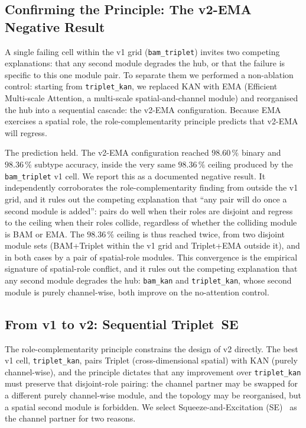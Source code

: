 \subsection{Confirming the Principle: The v2-EMA Negative
Result}\label{subsec:emaneg}

A single failing cell within the v1 grid (\texttt{bam\_triplet}) invites two
competing explanations: that any second module degrades the hub, or that the
failure is specific to this one module pair. To separate them we performed a
non-ablation control: starting from \texttt{triplet\_kan}, we replaced KAN with
EMA (Efficient Multi-scale Attention, a multi-scale spatial-and-channel module)
and reorganised the hub into a sequential cascade: the v2-EMA configuration.
Because EMA exercises a spatial role, the role-complementarity principle
predicts that v2-EMA will regress.

The prediction held. The v2-EMA configuration reached $98.60\,\%$ binary and
$98.36\,\%$ subtype accuracy, inside the very same $98.36\,\%$ ceiling
produced by the \texttt{bam\_triplet} v1 cell. We report this as a documented
negative result. It independently corroborates the role-complementarity finding
from outside the v1 grid, and it rules out the competing explanation that
``any pair will do once a second module is added'': pairs do well when their
roles are disjoint and regress to the ceiling when their roles collide,
regardless of whether the colliding module is BAM or EMA. The $98.36\,\%$
ceiling is thus reached twice, from two disjoint module sets (BAM+Triplet
within the v1 grid and Triplet+EMA outside it), and in both cases by a pair of
spatial-role modules. This convergence is the empirical signature of
spatial-role conflict, and it rules out the competing explanation that any
second module degrades the hub: \texttt{bam\_kan} and \texttt{triplet\_kan},
whose second module is purely channel-wise, both improve on the no-attention
control.

\subsection{From v1 to v2: Sequential Triplet~\arrowto{}SE}\label{subsec:v1tov2}

The role-complementarity principle constrains the design of v2 directly. The
best v1 cell, \texttt{triplet\_kan}, pairs Triplet (cross-dimensional spatial)
with KAN (purely channel-wise), and the principle dictates that any improvement
over \texttt{triplet\_kan} must preserve that disjoint-role pairing: the
channel partner may be swapped for a different purely channel-wise module, and
the topology may be reorganised, but a spatial second module is forbidden. We
select Squeeze-and-Excitation (SE)~\cite{hu2018se} as the channel partner for
two reasons.

